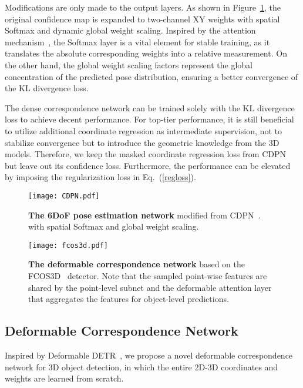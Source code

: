 \documentclass[10pt,twocolumn,letterpaper]{article}
\begin{document}
Modifications are only made to the output layers. As shown in Figure~\ref{fig:cdpn}, the original confidence map is expanded to two-channel XY weights with spatial Softmax and dynamic global weight scaling. Inspired by the attention mechanism~\cite{vaswani2017attention}, the Softmax layer is a vital element for stable training, as it translates the absolute corresponding weights into a relative measurement. On the other hand, the global weight scaling factors represent the global concentration of the predicted pose distribution, ensuring a better convergence of the KL divergence loss.

The dense correspondence network can be trained solely with the KL divergence loss  to achieve decent performance. For top-tier performance, it is still beneficial to utilize additional coordinate regression as intermediate supervision, not to stabilize convergence but to introduce the geometric knowledge from the 3D models. Therefore, we keep the masked coordinate regression loss from CDPN~\cite{CDPN}
but leave out its confidence loss. Furthermore, the performance can be elevated by imposing the regularization loss  in Eq.~(\ref{regloss}).

\begin{figure}[t]
\begin{center}
    \texttt{[image: CDPN.pdf]}
\end{center}
\vspace{-1ex}
\caption{\textbf{The 6DoF pose estimation network} modified from CDPN~\cite{CDPN}. 
with spatial Softmax and global weight scaling.}
\label{fig:cdpn}
\end{figure}

\begin{figure*}[t]
   \begin{center}
   \texttt{[image: fcos3d.pdf]}
   \end{center}
   \vspace{-2mm}
   \caption{\textbf{The deformable correspondence network} based on the FCOS3D~\cite{fcos3d} detector. Note that the sampled point-wise features are shared by the point-level subnet and the deformable attention layer that aggregates the features for object-level predictions.} 
\label{fig:fcos3d}
\end{figure*}

\subsection{Deformable Correspondence Network} \label{deformnetmain}
Inspired by Deformable DETR~\cite{deformabledetr}, we propose a novel deformable correspondence network for 3D object detection, in which the entire 2D-3D coordinates and weights are learned from scratch.
\end{document}
